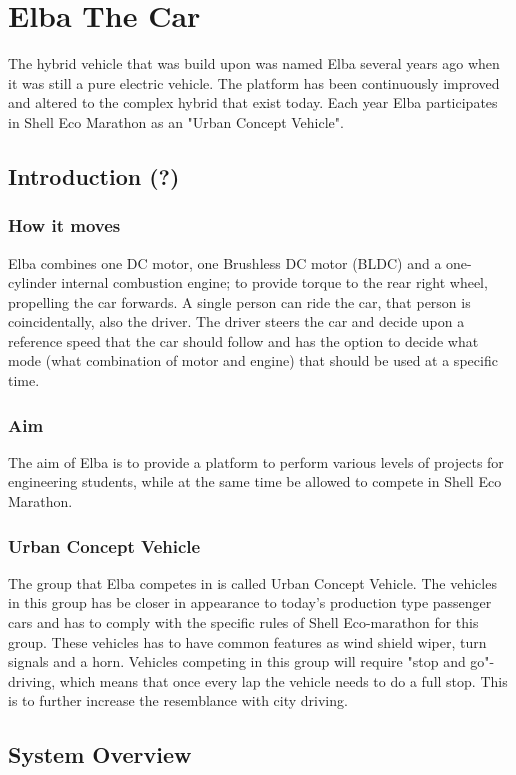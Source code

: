 \chapter{Elba The Car}
The hybrid vehicle that was build upon was named Elba several years ago when it was still a pure electric vehicle. The platform has been continuously improved and altered to the complex hybrid that exist today. Each year Elba participates in Shell Eco Marathon as an "Urban Concept Vehicle".

\section{Introduction (?)}
\subsection{How it moves}
Elba combines one DC motor, one Brushless DC motor (BLDC) and a one-cylinder internal combustion engine; to provide torque to the rear right wheel, propelling the car forwards.
A single person can ride the car, that person is coincidentally, also the driver. 
The driver steers the car and decide upon a reference speed that the car should follow and has the option to decide what mode (what combination of motor and engine) that should be used at a specific time.

\subsection{Aim}
The aim of Elba is to provide a platform to perform various levels of projects for engineering students, while at the same time be allowed to compete in Shell Eco Marathon.

\subsection{Urban Concept Vehicle}
The group that Elba competes in is called Urban Concept Vehicle. The vehicles in this group has be closer in appearance to today's production type passenger cars and has to comply with the specific rules of Shell Eco-marathon for this group. These vehicles has to have common features as wind shield wiper, turn signals and a horn. Vehicles competing in this group will require "stop and go"-driving, which means that once every lap the vehicle needs to do a full stop. This is to further increase the resemblance with city driving.

\section{System Overview}
